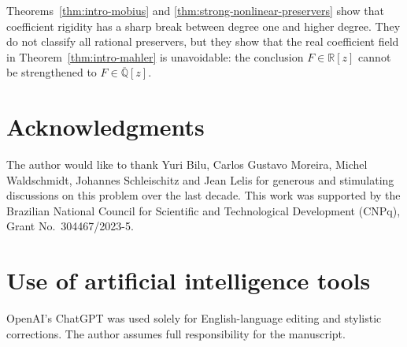 \documentclass[11pt]{amsart}
\numberwithin{equation}{section}
\theoremstyle{definition}
\theoremstyle{remark}
\newcommand{\R}{\mathbb R}
\newcommand{\Q}{\mathbb Q}
\begin{document}
Theorems~\ref{thm:intro-mobius} and
\ref{thm:strong-nonlinear-preservers} show that coefficient rigidity
has a sharp break between degree one and higher degree. They do not
classify all rational preservers, but they show that the real
coefficient field in Theorem~\ref{thm:intro-mahler} is unavoidable:
the conclusion \(F\in\R[z]\) cannot be strengthened to
\(F\in\overline{\Q}[z]\).

\section*{Acknowledgments}


The author would like to thank Yuri Bilu, Carlos Gustavo Moreira, Michel Waldschmidt, Johannes Schleischitz and Jean Lelis for generous and stimulating discussions on this problem over the last decade. This work was supported by the Brazilian National Council for Scientific and Technological Development (CNPq), Grant No.~304467/2023-5.


\section*{Use of artificial intelligence tools}

OpenAI's ChatGPT was used solely for English-language editing and stylistic corrections. The author assumes full responsibility for the manuscript.
\end{document}
